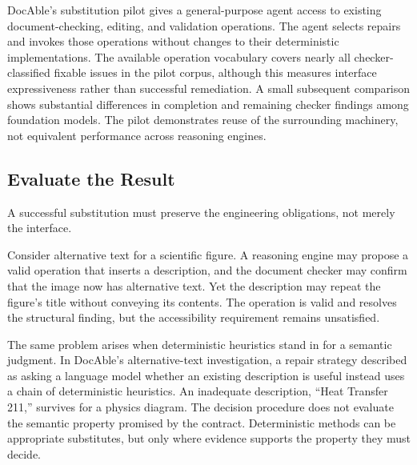 
DocAble's substitution pilot gives a general-purpose agent access to existing document-checking, editing, and validation operations. The agent selects repairs and invokes those operations without changes to their deterministic implementations. The available operation vocabulary covers nearly all checker-classified fixable issues in the pilot corpus, although this measures interface expressiveness rather than successful remediation. A small subsequent comparison shows substantial differences in completion and remaining checker findings among foundation models. The pilot demonstrates reuse of the surrounding machinery, not equivalent performance across reasoning engines.

\subsection*{Evaluate the Result}\label{heading:evaluate-the-result}

A successful substitution must preserve the engineering obligations, not merely the interface.

Consider alternative text for a scientific figure. A reasoning engine may propose a valid operation that inserts a description, and the document checker may confirm that the image now has alternative text. Yet the description may repeat the figure's title without conveying its contents. The operation is valid and resolves the structural finding, but the accessibility requirement remains unsatisfied.

The same problem arises when deterministic heuristics stand in for a semantic judgment. In DocAble's alternative-text investigation, a repair strategy described as asking a language model whether an existing description is useful instead uses a chain of deterministic heuristics. An inadequate description, ``Heat Transfer 211,'' survives for a physics diagram. The decision procedure does not evaluate the semantic property promised by the contract. Deterministic methods can be appropriate substitutes, but only where evidence supports the property they must decide.

